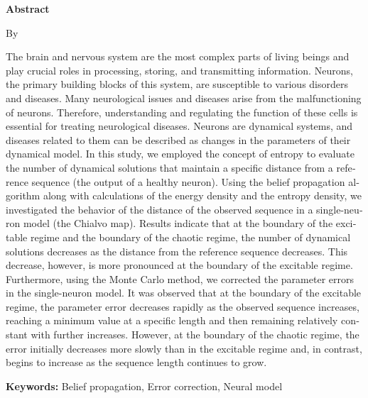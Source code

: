 \begin{latin}
    \setlength{\baselineskip}{16pt}
    {

        \centering
        \textbf{Abstract}

        \vspace{3\baselineskip}
        \textbf{\LatinTitle}

        \vspace{2\baselineskip}
        By \\
        \textbf{\LatinName} \par
    }

    \vspace{\baselineskip}
    The brain and nervous system are the most complex parts of living beings and play crucial roles in processing, storing, and transmitting information.
    Neurons, the primary building blocks of this system, are susceptible to various disorders and diseases.
    Many neurological issues and diseases arise from the malfunctioning of neurons.
    Therefore, understanding and regulating the function of these cells is essential for treating neurological diseases.
    Neurons are dynamical systems, and diseases related to them can be described as changes in the parameters of their dynamical model.
    In this study, we employed the concept of entropy to evaluate the number of dynamical solutions that maintain a specific distance from a reference sequence (the output of a healthy neuron).
    Using the belief propagation algorithm along with calculations of the energy density and the entropy density, we investigated the behavior of the distance of the observed sequence in a single-neuron model (the Chialvo map).
    Results indicate that at the boundary of the excitable regime and the boundary of the chaotic regime, the number of dynamical solutions decreases as the distance from the reference sequence decreases.
    This decrease, however, is more pronounced at the boundary of the excitable regime.
    Furthermore, using the Monte Carlo method, we corrected the parameter errors in the single-neuron model.
    It was observed that at the boundary of the excitable regime, the parameter error decreases rapidly as the observed sequence increases, reaching a minimum value at a specific length and then remaining relatively constant with further increases.
    However, at the boundary of the chaotic regime, the error initially decreases more slowly than in the excitable regime and, in contrast, begins to increase as the sequence length continues to grow.

    \textbf{Keywords:} Belief propagation, Error correction, Neural model
\end{latin}
